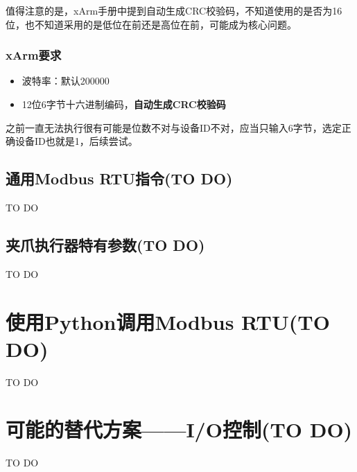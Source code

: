 \documentclass[UTF8]{ctexart}
\begin{document}
值得注意的是，xArm手册中提到自动生成CRC校验码，不知道使用的是否为16位，也不知道采用的是低位在前还是高位在前，可能成为核心问题。

\subsubsection{xArm要求}
\begin{itemize}
    \item 波特率：默认200000
    \item 12位6字节十六进制编码，\bf{自动生成}CRC校验码
\end{itemize}

之前一直无法执行很有可能是位数不对与设备ID不对，应当只输入6字节，选定正确设备ID也就是1，后续尝试。

\subsection{通用Modbus RTU指令(TO DO)}
TO DO
\subsection{夹爪执行器特有参数(TO DO)}
TO DO
\section{使用Python调用Modbus RTU(TO DO)}
TO DO

\section{可能的替代方案——I/O控制(TO DO)}
TO DO
\end{document}
